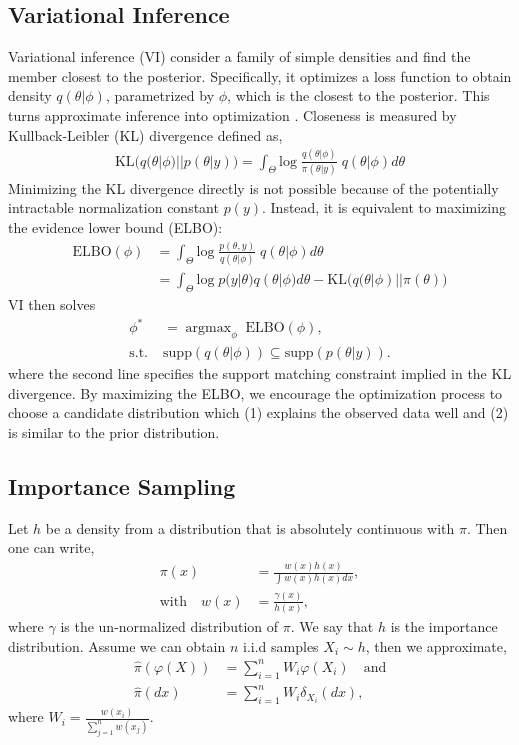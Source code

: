 \documentclass[twoside]{article}
\DeclareMathOperator*{\argmax}{argmax}
\begin{document}
\subsection{Variational Inference}
Variational inference (VI) consider a family of simple densities and find the member closest to the posterior. Specifically, it optimizes a loss function to obtain density $q(\theta | \phi)$, parametrized by $\phi$, which is the closest to the posterior. This turns approximate inference into optimization \citep{Variational_Inference_Review:2017}. Closeness is measured by Kullback-Leibler (KL) divergence defined as, 
\begin{align}
    \text{KL}\big(q(\theta|\phi) || p(\theta|y)\big) = \int_{\Theta} \textrm{log} \; \frac{q(\theta|\phi)} {\pi(\theta| y)}  \; q(\theta|\phi) d\theta
\end{align}
Minimizing the KL divergence directly is not possible because of the potentially intractable normalization constant $p(y)$. Instead, it is equivalent to maximizing the evidence lower bound (ELBO):
\begin{align}
    \text{ELBO}(\phi) &= \int_{\Theta} \textrm{log} \; \frac {p(\theta, y)} {q(\theta|\phi)} \; q(\theta|\phi) d\theta \\
    &= \int_{\Theta} \textrm{log} \; p(y | \theta) q(\theta|\phi) d\theta -  \text{KL}\big(q(\theta|\phi) || \pi(\theta)\big)
\end{align}
VI then solves
\begin{align}
  \phi^* &= \argmax_{\phi} \; \text{ELBO}(\phi), \nonumber\\
  \textrm{s.t.} \; & \textrm{supp}(q(\theta|\phi)) \subseteq  \textrm{supp}(p(\theta|y)).
\end{align}
where the second line specifies the support matching constraint implied in the KL divergence. By maximizing the ELBO, we encourage the optimization process to choose a candidate distribution which (1) explains the observed data well and (2) is similar to the prior distribution.


\subsection{Importance Sampling} \label{sec:is}
Let $h$ be a density from a distribution that is absolutely continuous with $\pi$. Then one can write,
\begin{align}
    \pi(x) &= \frac{w(x)h(x)}{\int w(x)h(x)dx}, \\
    \text{with} \quad w(x) &= \frac{\gamma(x)}{h(x)}, 
\end{align}
where $\gamma$ is the un-normalized distribution of $\pi$. We say that $h$ is the importance distribution. Assume we can obtain $n$ i.i.d samples $X_i \sim h$, then we approximate,
\begin{align}
    \hat{\pi}(\varphi(X)) &= \sum_{i = 1}^n W_i \varphi(X_i) \quad\text{and} \\
    \hat{\pi}(dx) &= \sum_{i = 1}^n W_i \delta_{X_i}(dx),
\end{align}
where $W_i = \frac{w(x_i)}{\sum_{j=1}^n w(x_j)}$. 
\end{document}
